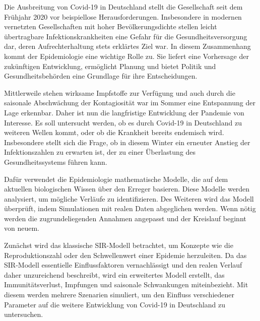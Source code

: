 \documentclass[../main.tex]{subfiles}
\begin{document}
    Die Ausbreitung von Covid-19 in Deutschland stellt die Gesellschaft seit dem Frühjahr 2020 vor beispiellose Herausforderungen. Insbesondere in modernen vernetzten Gesellschaften mit hoher Bevölkerungsdichte stellen leicht übertragbare Infektionskrankheiten eine Gefahr für die Gesundheitsversorgung dar, deren Aufrechterhaltung stets erklärtes Ziel war.
    In diesem Zusammenhang kommt der Epidemiologie eine wichtige Rolle zu. Sie liefert eine Vorhersage der zukünftigen Entwicklung, ermöglicht Planung und bietet Politik und Gesundheitsbehörden eine Grundlage für ihre Entscheidungen.

    Mittlerweile stehen wirksame Impfstoffe zur Verfügung und auch durch die saisonale Abschwächung der Kontagiosität war im Sommer eine Entspannung der Lage erkennbar. Daher ist nun die langfristige Entwicklung der Pandemie von Interesse.
    Es soll untersucht werden, ob es durch Covid-19 in Deutschland zu weiteren Wellen kommt, oder ob die Krankheit bereits endemisch wird.
    Insbesondere stellt sich die Frage, ob in diesem Winter ein erneuter Anstieg der Infektionszahlen zu erwarten ist, der zu einer Überlastung des Gesundheitssystems führen kann.

    Dafür verwendet die Epidemiologie mathematische Modelle, die auf dem aktuellen biologischen Wissen über den Erreger basieren. Diese Modelle werden analysiert, um mögliche Verläufe zu identifizieren. Des Weiteren wird das Modell überprüft, indem Simulationen mit realen Daten abgeglichen werden. Wenn nötig werden die zugrundeliegenden Annahmen angepasst und der Kreislauf beginnt von neuem.

    Zunächst wird das klassische SIR-Modell betrachtet, um Konzepte wie die Reproduktionszahl oder den Schwellenwert einer Epidemie herzuleiten. Da das SIR-Modell essentielle Einflussfaktoren vernachlässigt und den realen Verlauf daher unzureichend beschreibt, wird ein erweitertes Modell erstellt, das Immunitätsverlust, Impfungen und saisonale Schwankungen miteinbezieht. Mit diesem werden mehrere Szenarien simuliert, um den Einfluss verschiedener Parameter auf die weitere Entwicklung von Covid-19 in Deutschland zu untersuchen.
\end{document}

